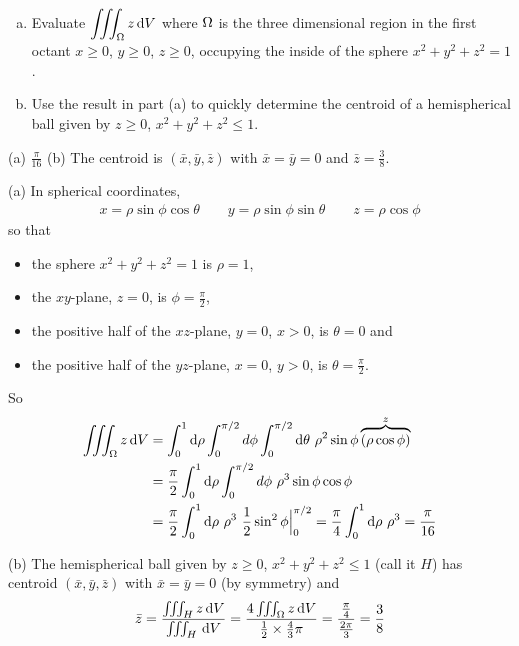 \begin{question}[M200 2002A] %
\begin{enumerate}[(a)]
\item
Evaluate $\displaystyle\iiint_\Omega z\,\mathrm{d}V$ where $\Omega$
is the three dimensional region in the first octant $x\ge 0$, $y\ge 0$,
$z\ge 0$, occupying the inside of the sphere $x^2+y^2+z^2=1$.

\item
Use the result in part (a) to quickly determine the centroid
of a hemispherical ball given by $z\ge 0$, $x^2+y^2+z^2\le 1$.
\end{enumerate}
\end{question}


\begin{answer}
(a) $\frac{\pi}{16}$\qquad
(b)  The centroid is $(\bar x,\bar y,\bar z)$ with 
$\bar x=\bar y=0$ and $\bar z=\frac{3}{8}$.
\end{answer}

\begin{solution}
(a) 
In spherical coordinates,
\begin{align*}
x=\rho\sin\phi\cos\theta\qquad y=\rho\sin\phi\sin\theta\qquad z=\rho\cos\phi
\end{align*}
so that
\begin{itemize}
\item
the sphere $x^2+y^2+z^2=1$ is $\rho=1$, 
\item
the $xy$-plane, $z=0$, is $\phi=\frac{\pi}{2}$, 
\item
the positive half of the $xz$-plane, $y=0$, $x>0$, is $\theta=0$ and 
\item
the positive half of the $yz$-plane, $x=0$, $y>0$, is $\theta=\frac{\pi}{2}$. 
\end{itemize}
So
\begin{align*}
\iiint_\Omega z\,\mathrm{d}V&=
\int_0^1 \mathrm{d}\rho\int_0^{\pi/2}d\phi\int _0^{\pi/2}\mathrm{d}\theta\  \rho^2\sin\phi\overbrace{(\rho\cos\phi)}^{z} \\
&=\frac{\pi}{2}\int_0^1 \mathrm{d}\rho\int_0^{\pi/2}d\phi\  \rho^3\sin\phi \cos\phi
\\
&=\frac{\pi}{2}\int_0^1 \mathrm{d}\rho\  \rho^3\ \frac{1}{2}\sin^2\phi \Big|_0^{\pi/2}
=\frac{\pi}{4}\int_0^1 \mathrm{d}\rho\  \rho^3
=\frac{\pi}{16}
\end{align*}

(b) The hemispherical ball given by $z\ge 0$, $x^2+y^2+z^2\le 1$
(call it $H$) has centroid $(\bar x,\bar y,\bar z)$ with 
$\bar x=\bar y=0$ (by symmetry) and
\begin{align*}
\bar z=\frac{\iiint_H z\,\mathrm{d}V}{\iiint_H\,\mathrm{d}V}
=\frac{4\iiint_\Omega z\,\mathrm{d}V}{\tfrac{1}{2}\times\frac{4}{3}\pi}
=\frac{\frac{\pi}{4}}{\frac{2\pi}{3}}
=\frac{3}{8}
\end{align*}
\end{solution}


